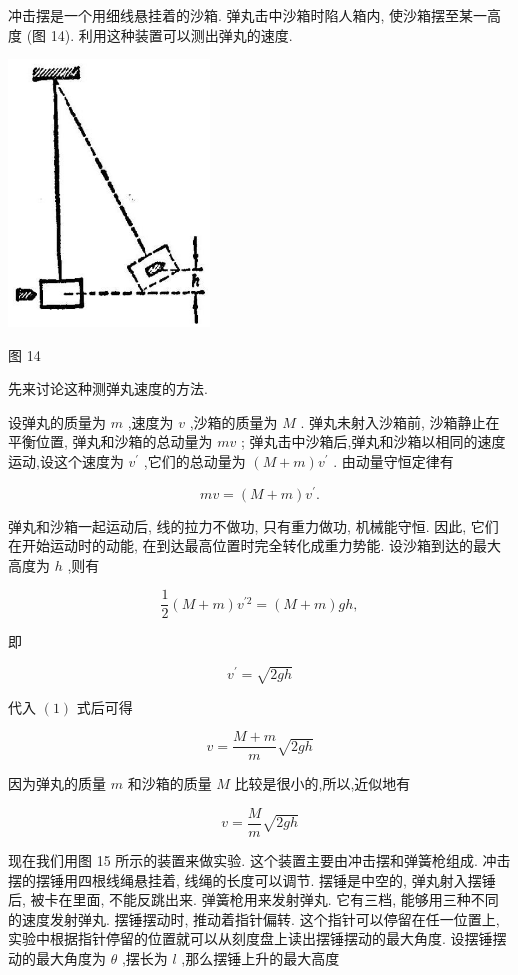 \documentclass[10pt]{article}
\begin{document}
冲击摆是一个用细线悬挂着的沙箱. 弹丸击中沙箱时陷人箱内, 使沙箱摆至某一高度 (图 14). 利用这种装置可以测出弹丸的速度.

\begin{center}
\includegraphics[max width=0.4\textwidth]{images/01912d55-147c-70aa-b0e0-1782a122f948_335_488280.jpg}
\end{center}

图 14

先来讨论这种测弹丸速度的方法.

设弹丸的质量为 \(m\) ,速度为 \(v\) ,沙箱的质量为 \(M\) . 弹丸未射入沙箱前, 沙箱静止在平衡位置, 弹丸和沙箱的总动量为 \({mv}\) ; 弹丸击中沙箱后,弹丸和沙箱以相同的速度运动,设这个速度为 \({v}^{\prime }\) ,它们的总动量为 \(\left( {M + m}\right) {v}^{\prime }\) . 由动量守恒定律有

\[
{mv} = \left( {M + m}\right) {v}^{\prime }. \tag{1}
\]

弹丸和沙箱一起运动后, 线的拉力不做功, 只有重力做功, 机械能守恒. 因此, 它们在开始运动时的动能, 在到达最高位置时完全转化成重力势能. 设沙箱到达的最大高度为 \(h\) ,则有

\[
\frac{1}{2}\left( {M + m}\right) {v}^{\prime 2} = \left( {M + m}\right) {gh}, \tag{2}
\]

即

\[
{v}^{\prime } = \sqrt{2gh}
\]

代入 \(\left( 1\right)\) 式后可得

\[
v = \frac{M + m}{m}\sqrt{2gh} \tag{3}
\]

因为弹丸的质量 \(m\) 和沙箱的质量 \(M\) 比较是很小的,所以,近似地有

\[
v = \frac{M}{m}\sqrt{2gh} \tag{4}
\]

现在我们用图 15 所示的装置来做实验. 这个装置主要由冲击摆和弹簧枪组成. 冲击摆的摆锤用四根线绳悬挂着, 线绳的长度可以调节. 摆锤是中空的, 弹丸射入摆锤后, 被卡在里面, 不能反跳出来. 弹簧枪用来发射弹丸. 它有三档, 能够用三种不同的速度发射弹丸. 摆锤摆动时, 推动着指针偏转. 这个指针可以停留在任一位置上, 实验中根据指针停留的位置就可以从刻度盘上读出摆锤摆动的最大角度. 设摆锤摆动的最大角度为 \(\theta\) ,摆长为 \(l\) ,那么摆锤上升的最大高度
\end{document}
